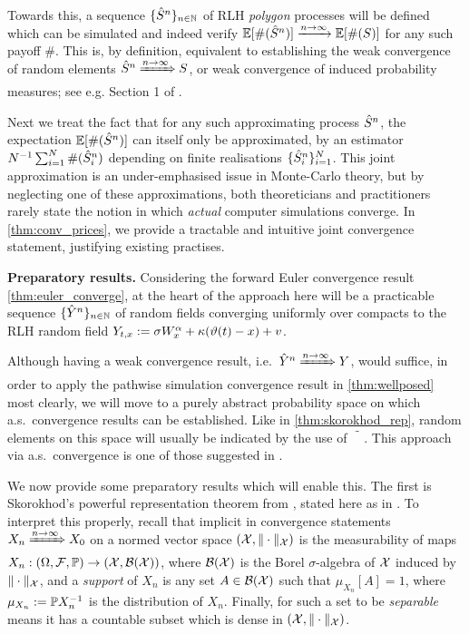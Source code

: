 Towards this, a sequence $\{{\hat{S}}^n\}_{n\in\mathbb{N}}$ of RLH \emph{polygon} processes will be defined which can be simulated and indeed verify $\mathbb{E}[\#({\hat{S}}^n)]\xrightarrow{n\to\infty}\mathbb{E}[\#(S)]$ for any such payoff $\#$. This is, by definition, equivalent to establishing the weak convergence of random elements ${\hat{S}}^n\xRightarrow{n\to\infty} S$, or weak convergence of induced probability measures; see e.g. Section 1 of \cite{billingsley_1999}.

Next we treat the fact that for any such approximating process ${\hat{S}}^n$, the expectation $\mathbb{E}[\#({\hat{S}}^n)]$ can itself only be approximated, by an estimator $N^{-1}\sum_{i=1}^N \#({\hat{S}}^n_i)$ depending on finite realisations $\{{\hat{S}}_i^n\}_{i=1}^N$. This joint approximation is an under-emphasised issue in Monte-Carlo theory, but by neglecting one of these approximations, both theoreticians and practitioners rarely state the notion in which \emph{actual} computer simulations converge. In \autoref{thm:conv_prices}, we provide a tractable and intuitive joint convergence statement, justifying existing practises.

\vspace{3mm}\textbf{Preparatory results.} Considering the forward Euler convergence result \autoref{thm:euler_converge}, at the heart of the approach here will be a practicable sequence $\{{\hat{Y}}^n\}_{n\in\mathbb{N}}$ of random fields converging uniformly over compacts to the RLH random field $Y_{t,x}:=\sigma W^\alpha_x+\kappa(\vartheta(t)-x)+v$.

Although having a weak convergence result, i.e.~${\hat{Y}}^n\xRightarrow{n\to\infty} Y$, would suffice, in order to apply the pathwise simulation convergence result in \autoref{thm:wellposed} most clearly, we will move to a purely abstract probability space on which a.s.~convergence results can be established. Like in \autoref{thm:skorokhod_rep}, random elements on this space will usually be indicated by the use of $\tilde{{\color{white}X}}$. This approach via a.s.~convergence is one of those suggested in \cite{billingsley_1999}.

We now provide some preparatory results which will enable this. The first is Skorokhod's powerful representation theorem from \cite{skorokhod_1956}, stated here as in \cite{billingsley_1999}. To interpret this properly, recall that implicit in convergence statements $X_n\xRightarrow{n\to\infty} X_0$ on a normed vector space $(\mathcal{X},\Vert\cdot\Vert_{\mathcal{X}})$ is the measurability of maps $X_n:(\Omega,\mathcal{F},\mathbb{P})\to(\mathcal{X},\mathcal{B}(\mathcal{X}))$, where $\mathcal{B}(\mathcal{X})$ is the Borel $\sigma$-algebra of $\mathcal{X}$ induced by $\Vert\cdot\Vert_{\mathcal{X}}$, and a \emph{support} of $X_n$ is any set $A\in\mathcal{B}(\mathcal{X})$ such that $\mu_{X_n}[A]=1$, where $\mu_{X_n}:=\mathbb{P} X_n^{-1}$ is the distribution of $X_n$. Finally, for such a set to be \emph{separable} means it has a countable subset which is dense in $(\mathcal{X},\Vert\cdot\Vert_{\mathcal{X}})$.

